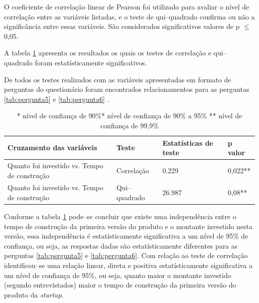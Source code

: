 O coeficiente de correla\c{c}\~ao linear de Pearson foi utilizado para avaliar o n\'ivel de correla\c{c}\~ao entre as vari\'aveis listadas, e o teste de qui--quadrado confirma ou n\~ao a signific\^ancia entre essas vari\'aveis. S\~ao considerados significativos valores de p $\leq$ 0,05.

A tabela \ref{tab:cruza1} apresenta os resultados os quais os testes de correla\c{c}\~ao e qui--quadrado foram estat\'isticamente significativos.

De todos os testes realizados com as vari\'aveis apresentadas em formato de perguntas do question\'ario foram encontrados relacionamentos para as perguntas \ref{tab:pergunta5} e \ref{tab:pergunta6} .

\begin{table}[hb]
\centering
\caption{Testes de correla\c{c}\~ao e qui--quadrado}
\label{tab:cruza1}
\begin{tabular}{|p{5cm}|p{3cm}|p{3cm}|p{2cm}|}
\hline{\bf Cruzamento das vari\'aveis} & {\bf Teste} & {\bf Estat\'isticas de teste} & {\bf p valor}\\
\hline Quanto foi investido vs. Tempo de constru\c{c}\~ao & Correla\c{c}\~ao & 0.229 & 0,022**\\
\hline Quanto foi investido vs. Tempo de constru\c{c}\~ao & Qui--quadrado & 26.987 & 0,08**\\
\hline
\end{tabular}
\captionsetup{justification=raggedright, singlelinecheck=false}
\caption*{* n\'ivel de confian\c{c}a de 90\%\linebreak ** n\'ivel de confian\c{c}a de 90\% a 95\% \linebreak *** n\'ivel de confian\c{c}a de 99,9\%}
\end{table}

Conforme a tabela \ref{tab:cruza1} pode--se concluir que existe uma independ\^encia entre o tempo de constru\c{c}\~ao da primeira vers\~ao do produto e o montante investido nesta vers\~ao, essa independ\^encia \'e estat\'isticamente significativa a um n\'ivel de 95\% de confian\c{c}a, ou seja, as respostas dadas s\~ao estat\'isticamente diferentes para as perguntas \ref{tab:pergunta5} e \ref{tab:pergunta6}. Com rela\c{c}\~ao ao teste de correla\c{c}\~ao identificou--se uma rela\c{c}\~ao linear, direta e positiva estat\'isticamente significativa a um n\'ivel de confian\c{c}a de 95\%, ou seja, quanto maior o montante investido (segundo entrevistados) maior o tempo de constru\c{c}\~ao da primeira vers\~ao do produto da \emph{startup}.


